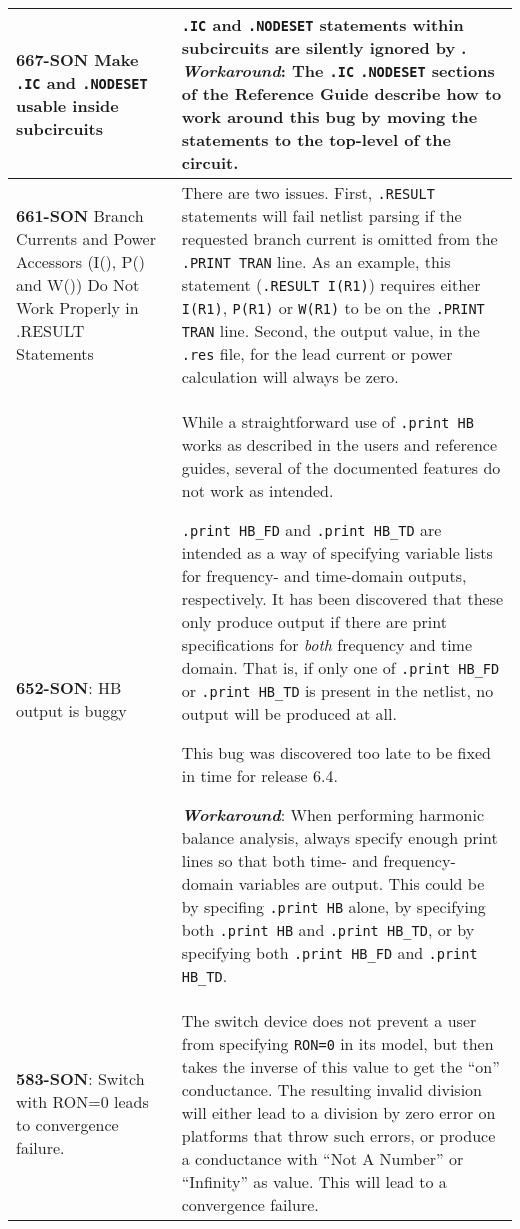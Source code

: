 {\begin{longtable}[h] {>{\raggedright\small}m{2in}|>{\raggedright\let\\\tabularnewline\small}m{3.5in}}
\textbf{667-SON} Make \texttt{.IC} and \texttt{.NODESET} usable inside subcircuits & 
\texttt{.IC} and \texttt{.NODESET} statements within subcircuits are
silently ignored by \Xyce{}. \textbf{\textit{Workaround}}: The \texttt{.IC}
\texttt{.NODESET} sections of the \Xyce{} Reference Guide describe how to
work around this bug by moving the statements to the top-level of the
circuit.
\\ \hline

\textbf{661-SON} Branch Currents and Power Accessors (I(), P() and W()) Do Not Work 
Properly in .RESULT Statements  & There are two issues.  First, \texttt{.RESULT} statements 
will fail netlist parsing if the requested branch current is omitted from the \texttt{.PRINT TRAN} 
line.  As an example, this statement (\texttt{.RESULT I(R1)}) requires either \texttt{I(R1)},
\texttt{P(R1)} or \texttt{W(R1)} to be on the \texttt{.PRINT TRAN} line.  Second, the
output value, in the \texttt{.res} file, for the lead current or power calculation will 
always be zero.
\\ \hline 

\textbf{652-SON}: HB output is buggy & While a straightforward use of \texttt{.print HB} works as described in the users and reference guides, several of the documented features do not work as intended.

\texttt{.print HB\_FD} and \texttt{.print HB\_TD} are intended as a way of specifying variable lists for frequency- and time-domain outputs, respectively.  It has been discovered that these only produce output if there are print specifications for {\em both\/} frequency and time domain.  That is, if only one of \texttt{.print HB\_FD} or \texttt{.print HB\_TD} is present in the netlist, no output will be produced at all.   

This bug was discovered too late to be fixed in time for release 6.4.

\textbf{\textit{Workaround}}: When performing harmonic balance analysis, always specify enough print lines so that both time- and frequency-domain variables are output.  This could be by specifing \texttt{.print HB} alone, by specifying both \texttt{.print HB} and \texttt{.print HB\_TD}, or by specifying both \texttt{.print HB\_FD} and \texttt{.print HB\_TD}.
\\ \hline


\textbf{583-SON}: Switch with RON=0 leads to convergence failure. &  The switch device does not prevent a user from specifying \texttt{RON=0} in its model, but then takes the inverse of this value to get the ``on'' conductance.  The resulting invalid division will either lead to a division by zero error on platforms that throw such errors, or produce a conductance with ``Not A Number'' or ``Infinity'' as value.  This will lead to a convergence failure.


\end{longtable}}

